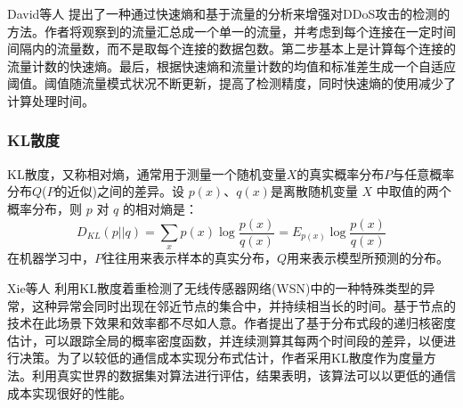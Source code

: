 David等人\cite{david2015ddos} 提出了一种通过快速熵和基于流量的分析来增强对DDoS攻击的检测的方法。作者将观察到的流量汇总成一个单一的流量，并考虑到每个连接在一定时间间隔内的流量数，而不是取每个连接的数据包数。第二步基本上是计算每个连接的流量计数的快速熵。最后，根据快速熵和流量计数的均值和标准差生成一个自适应阈值。阈值随流量模式状况不断更新，提高了检测精度，同时快速熵的使用减少了计算处理时间。






\subsubsection{KL散度}
KL散度，又称相对熵，通常用于测量一个随机变量$X$的真实概率分布$P$与任意概率分布$Q$($P$的近似)之间的差异。设 $p(x)$、$q(x)$是离散随机变量 $X$ 中取值的两个概率分布，则 $p$ 对 $q$ 的相对熵是：
\begin{equation}
    D_{KL}(p||q) = \sum_x p(x) \log \frac{p(x)}{q(x)} = E_{p(x)} \log \frac{p(x)}{q(x)}
\end{equation}
在机器学习中，$P$往往用来表示样本的真实分布，$Q$用来表示模型所预测的分布。


Xie等人\cite{xie2016distributed} 利用KL散度着重检测了无线传感器网络(WSN)中的一种特殊类型的异常，这种异常会同时出现在邻近节点的集合中，并持续相当长的时间。基于节点的技术在此场景下效果和效率都不尽如人意。作者提出了基于分布式段的递归核密度估计，可以跟踪全局的概率密度函数，并连续测算其每两个时间段的差异，以便进行决策。为了以较低的通信成本实现分布式估计，作者采用KL散度作为度量方法。利用真实世界的数据集对算法进行评估，结果表明，该算法可以以更低的通信成本实现很好的性能。

